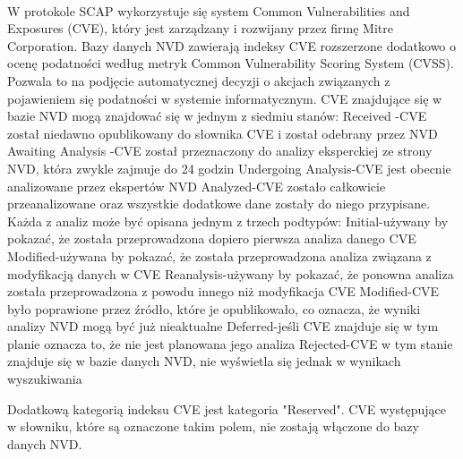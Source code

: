 \documentclass[a4paper,12pt,twoside]{article}
\newcommand\tab[1][1cm]{\hspace*{#1}}
\begin{document}
\paragraph{}
W protokole SCAP wykorzystuje się system Common Vulnerabilities and Exposures (CVE), który jest zarządzany i rozwijany przez firmę Mitre Corporation. Bazy danych NVD zawierają indeksy CVE rozszerzone dodatkowo o ocenę podatności według metryk Common Vulnerability Scoring System (CVSS). Pozwala to na podjęcie automatycznej decyzji o akcjach związanych z pojawieniem się podatności w systemie informatycznym. CVE znajdujące się w bazie NVD mogą znajdować się w jednym z siedmiu stanów:
\newline Received  \tab\tab\tab -\tab CVE został niedawno opublikowany do słownika CVE i został odebrany przez NVD\newline{}
Awaiting   Analysis \tab-\tab CVE został przeznaczony do analizy eksperckiej ze strony NVD, która zwykle zajmuje do 24 godzin\newline{}
Undergoing Analysis\tab -\tab CVE jest obecnie analizowane przez ekspertów NVD\newline{}
Analyzed\tab\tab -\tab CVE zostało całkowicie przeanalizowane oraz wszystkie dodatkowe dane zostały do niego przypisane. Każda z analiz może być opisana jednym z trzech podtypów:\newline{}
    \tab\tab Initial\tab\tab -\tab używany by pokazać, że została przeprowadzona dopiero pierwsza analiza danego CVE\newline{}
    \tab\tab Modified\tab\tab -\tab używana by pokazać, że została przeprowadzona analiza związana z modyfikacją danych w CVE\newline{}
    \tab\tab Reanalysis\tab\tab -\tab używany by pokazać, że ponowna analiza została przeprowadzona z powodu innego niż modyfikacja CVE\newline{}
Modified\tab\tab\tab -\tab CVE było poprawione przez źródło, które je opublikowało, co oznacza, że wyniki analizy NVD mogą być już nieaktualne\newline{}
Deferred\tab\tab\tab -\tab jeśli CVE znajduje się w tym planie oznacza to, że nie jest planowana jego analiza\newline{}
Rejected\tab\tab\tab -\tab CVE w tym stanie znajduje się w bazie danych NVD, nie wyświetla się jednak w wynikach wyszukiwania\newline{}

Dodatkową kategorią indeksu CVE jest kategoria "Reserved". CVE występujące w słowniku, które są oznaczone takim polem, nie zostają włączone do bazy danych NVD\cite{nvd_official}.
\end{document}
